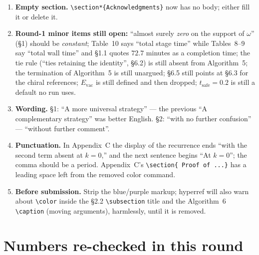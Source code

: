 \documentclass[11pt]{article}
\begin{document}
\begin{enumerate}[leftmargin=*,itemsep=4pt]
\item \textbf{Empty section.} \verb|\section*{Acknowledgments}| now has no
      body; either fill it or delete it.
\item \textbf{Round-1 minor items still open:} ``almost surely \emph{zero} on
      the support of $\omega$'' (\S1) should be \emph{constant}; Table~10 says
      ``total stage time'' while Tables~8--9 say ``total wall time'' and \S1.1
      quotes $72.7$ minutes as a completion time; the tie rule (``ties
      retaining the identity'', \S6.2) is still absent from Algorithm~5; the
      termination of Algorithm~5 is still unargued; \S6.5 still points at
      \S6.3 for the chiral references; $E_{\mathrm{vac}}$ is still defined and
      then dropped; $t_{\mathrm{safe}}=0.2$ is still a default no run uses.
\item \textbf{Wording.} \S1: ``A more universal strategy'' --- the previous
      ``A complementary strategy'' was better English. \S2: ``with no further
      confusion'' --- ``without further comment''.
\item \textbf{Punctuation.} In Appendix~C the display of the recurrence ends
      ``with the second term absent at $k=0$,'' and the next sentence begins
      ``At $k=0$''; the comma should be a period. Appendix~C's
      \verb|\section{ Proof of ...}| has a leading space left from the removed
      color command.
\item \textbf{Before submission.} Strip the blue/purple markup; hyperref will
      also warn about \verb|\color| inside the \S2.2 \verb|\subsection| title
      and the Algorithm~6 \verb|\caption| (moving arguments), harmlessly, until
      it is removed.
\end{enumerate}

\appendix
\section{Numbers re-checked in this round}
\end{document}
